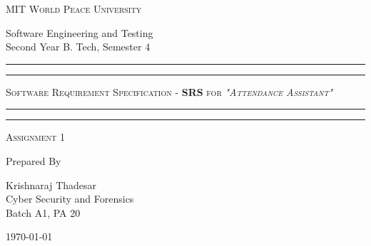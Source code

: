 \documentclass[11pt]{article}
\begin{document}
\begin{titlepage}
	\centering


	\huge\textsc{
		MIT World Peace University
	}\\

	\vspace{0.75\baselineskip} %

	\LARGE{
		Software Engineering and Testing\\
		Second Year B. Tech, Semester 4
	}

	\vfill %


	\rule{\textwidth}{1.6pt}\vspace*{-\baselineskip}\vspace*{2pt}
	\rule{\textwidth}{0.6pt}
	\vspace{0.75\baselineskip} %



	\huge{\textsc{
			Software Requirement Specification - \textbf{SRS} for
			\textit{"Attendance Assistant"}
		}} \\



	\vspace{0.5\baselineskip} %
	\rule{\textwidth}{0.6pt}\vspace*{-\baselineskip}\vspace*{2.8pt}
	\rule{\textwidth}{1.6pt}

	\vspace{1\baselineskip} %


	\LARGE\textsc{
		Assignment 1
	} %
	\vfill


	Prepared By
	\vspace{0.5\baselineskip} %

	\Large{
		Krishnaraj Thadesar \\
		Cyber Security and Forensics\\
		Batch A1, PA 20
	}


	\vspace{0.5\baselineskip} %
	\today

\end{titlepage}
\end{document}
